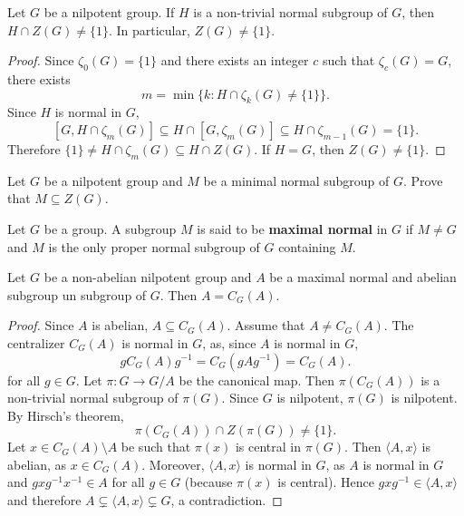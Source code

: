 \begin{theorem}[Hirsch]
\label{thm:Hirsch}
Let $G$ be a nilpotent group. If $H$ is a non-trivial normal subgroup of $G$, 
then $H\cap Z(G)\ne\{1\}$. In particular, $Z(G)\ne\{1\}$. 
\end{theorem}

\begin{proof}
Since $\zeta_0(G)=\{1\}$ and there exists an integer $c$ such that $\zeta_c(G)=G$, 
there exists 
\[
m=\min\{k:H\cap\zeta_k(G)\ne\{1\}\}.
\]
Since $H$ is normal in $G$, 
\[
[G,H\cap\zeta_m(G)]\subseteq H\cap[G,\zeta_m(G)]\subseteq H\cap\zeta_{m-1}(G)=\{1\}.
\]
Therefore $\{1\}\ne H\cap\zeta_m(G)\subseteq H\cap Z(G)$. If $H=G$, then $Z(G)\ne\{1\}$. 
\end{proof}

\begin{exercise}
\label{xca:nilpotente_minimalnormal}
Let $G$ be a nilpotent group and $M$ be a minimal normal subgroup of $G$. Prove 
that $M\subseteq Z(G)$.
\end{exercise}


\begin{definition}
    Let $G$ be a group. A subgroup $M$ is said to be \textbf{maximal normal} in $G$
    if $M\ne G$ and $M$ is the only proper normal subgroup of $G$ containing $M$. 
\end{definition}

\begin{corollary}
Let $G$ be a non-abelian nilpotent group and $A$ be a maximal normal and abelian 
subgroup un subgroup of $G$. Then $A=C_G(A)$.
\end{corollary}

\begin{proof}
Since $A$ is abelian, $A\subseteq C_G(A)$. Assume that $A\ne C_G(A)$.
The centralizer $C_G(A)$ is normal in $G$, as, since $A$ is normal in $G$, 
\[
gC_G(A)g^{-1}=C_G(gAg^{-1})=C_G(A).
\]
for all $g\in G$. Let $\pi\colon G\to G/A$ be the canonical map. 
Then $\pi(C_G(A))$ is a non-trivial normal subgroup of $\pi(G)$. Since 
$G$ is nilpotent, $\pi(G)$ is nilpotent. By Hirsch's theorem, 
\[
\pi(C_G(A))\cap Z(\pi(G))\ne\{1\}.
\]
Let $x\in C_G(A)\setminus A$ be such that $\pi(x)$ is central in $\pi(G)$.  Then 
$\langle A,x\rangle$ is abelian, as $x\in C_G(A)$. Moreover,  $\langle
A,x\rangle$ is normal in $G$, as $A$ is normal in $G$ and 
$gxg^{-1}x^{-1}\in A$ for all  $g\in G$ (because $\pi(x)$ is central). Hence
	$gxg^{-1}\in \langle A,x\rangle$ and therefore $A\subsetneq \langle
	A,x\rangle\subsetneq G$, a contradiction.
\end{proof}


